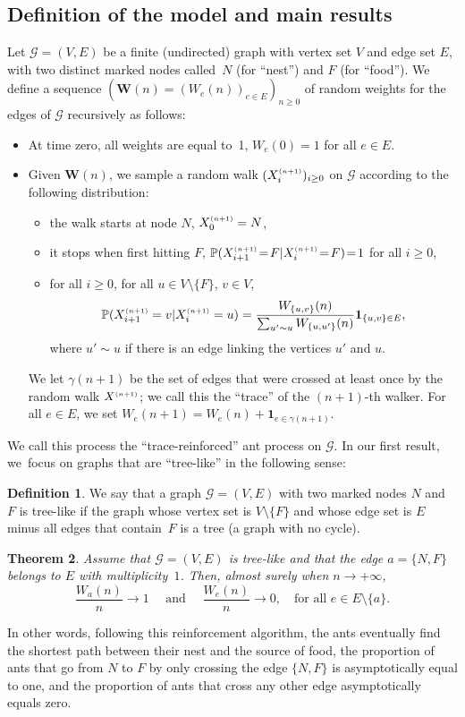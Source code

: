 \documentclass[JEP,XML,SOM,Unicode,NoFloatCountersInSection,published]{cedram}
\let\mathcal\mathscr
\newcommand{\bW}{\boldsymbol{W}}
\numberwithin{equation}{section}
\newtheorem{theorem}{Theorem}[section]
\theoremstyle{definition}
\newtheorem{definition}[theorem]{Definition}
\let\bs\boldsymbol
\newcommand{\sss}{\ensuremath{\scriptscriptstyle}}
\begin{document}
\subsection{Definition of the model and main results}
Let $\mathcal G\!=\!(V,E)$ be a \hbox{finite} (undirected) graph with vertex set $V$ and edge set $E$,
with two distinct marked nodes called~$N$ (for ``nest'') and $F$ (for ``food'').
We define a sequence $(\bW(n)\!=\!(W_e(n))_{e\in E})_{n\geq 0}$ of random weights for the edges of $\mathcal G$ recursively as follows:
\begin{itemize}
\item At time zero, all weights are equal to~1, \ie $W_e(0) = 1$ for all $e\in E$.
\item Given $\bW(n)$, we sample a random walk $(X^{\sss (n+1)}_i)_{i\geq 0}$
on $\mathcal G$ according to the following distribution:
\begin{itemize}
\item the walk starts at node $N$, \ie $X_0^{\sss (n+1)} = N$,
\item it stops when first hitting $F$, \ie $\mathbb P(X^{\sss (n+1)}_{i+1}\!=\!F | X^{\sss (n+1)}_{i}\!=\!F)\!=\!1$ for all $i\!\geq\!0$,
\item for all $i\geq 0$, for all {$u\in V\setminus\{F\}$}, $v\in V$,
\[
\mathbb P(X^{\sss (n+1)}_{i+1} = v | X^{\sss (n+1)}_{i}=u) = \frac{W_{\{u,v\}}(n)}{\sum_{u'\sim u}W_{\{u,u'\}}(n)} \bs 1_{\{u,v\}\in E},
\]
where $u'\sim u$ if there is an edge linking the vertices $u'$ and $u$.
\end{itemize}
We let $\gamma(n+1)$ be the set of edges that were crossed at least once
by the random walk $X^{\sss (n+1)}$; we call this the ``trace'' of the $(n+1)$-th walker.
For all $e\in E$, we set $W_e(n+1) = W_e(n)+\bs 1_{e\in \gamma(n+1)}$.
\end{itemize}

We call this process the ``trace-reinforced'' ant process on $\mathcal G$. In our first result, we~focus on graphs that are ``tree-like'' in the following sense:

\begin{definition}
We say that a graph $\mathcal G = (V,E)$ with two marked nodes $N$ and~$F$
is tree-like if the graph whose vertex set is $V\setminus \{F\}$
and whose edge set is $E$ minus all edges that contain~$F$ is a tree (\ie a graph with no cycle).
\end{definition}

\begin{theorem}\label{th:main}
Assume that $\mathcal G = (V,E)$ is tree-like and that the edge $a=\{N,F\}$ belongs to $E$ with multiplicity~$1$.
Then, almost surely when $n\to+\infty$,
\[
\frac{W_a(n)}{n} \to 1
\quad\text{ and }\quad
\frac{W_e(n)}{n} \to 0,\quad \text{for all } e\in E\setminus\{a\}.
\]
\end{theorem}
In other words, following this reinforcement algorithm, the ants eventually find the shortest path between their nest and the source of food, \ie the proportion of ants that go from $N$ to $F$ by only crossing the edge $\{N,F\}$ is asymptotically equal to one, and the proportion of ants that cross any other edge asymptotically equals zero.
\end{document}
